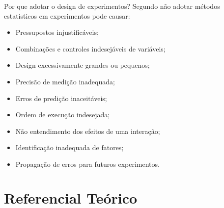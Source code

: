 \documentclass[aspectratio=43,10pt]{beamer}
\begin{document}
\begin{frame}{Por que adotar o design de experimentos?}
   Segundo  não adotar métodos estatísticos em experimentos pode causar:
   \begin{itemize}
       \item Pressupostos injustificáveis;
       \item Combinações e controles indesejáveis de variáveis;
       \item Design excessivamente grandes ou pequenos;
       \item Precisão de medição inadequada;
       \item Erros de predição inaceitáveis;
       \item Ordem de execução indesejada;
       \item Não entendimento dos efeitos de uma interação;
       \item Identificação inadequada de fatores;
       \item Propagação de erros para futuros experimentos.
   \end{itemize}
\end{frame}

\section{Referencial Teórico}
\end{document}
